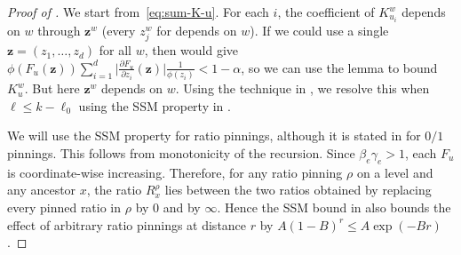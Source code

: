 \documentclass[11pt]{amsart}
\theoremstyle{definition}
\theoremstyle{remark}
\begin{document}
\begin{proof}[Proof of ]
    We start from~\eqref{eq:sum-K-u}.
    For each $i$, the coefficient of $K_{u_i}^w$ depends on $w$ through $\boldsymbol{z}^w$ (every $z_j^w$ for depends on $w$). If we could use a single $\boldsymbol{z} = (z_1,\ldots,z_d)$ for all $w$, then  would give $\phi(F_u(\boldsymbol{z})) \sum_{i=1}^d \bigl| \frac{\partial F_u}{\partial z_i}(\boldsymbol{z}) \bigr| \frac{1}{\phi(z_i)} < 1 - \alpha$, so we can use the lemma to bound $K_u^w$. But here $\boldsymbol{z}^w$ depends on $w$. 
Using the technique in \cite{ALO24},
we resolve this when $\ell \leq k - \ell_0$ using the SSM property in .

We will use the SSM property for ratio pinnings, although it is stated in  for $0/1$ pinnings. This follows from monotonicity of the recursion. Since $\beta_e\gamma_e>1$, each $F_u$ is coordinate-wise increasing. Therefore, for any ratio pinning $\rho$ on a level and any ancestor $x$, the ratio $R_x^\rho$ lies between the two ratios obtained by replacing every pinned ratio in $\rho$ by $0$ and by $\infty$. Hence the SSM bound in  also bounds the effect of arbitrary ratio pinnings at distance $r$ by $A(1-B)^r \leq A\exp(-Br)$.


\end{proof}
\end{document}
